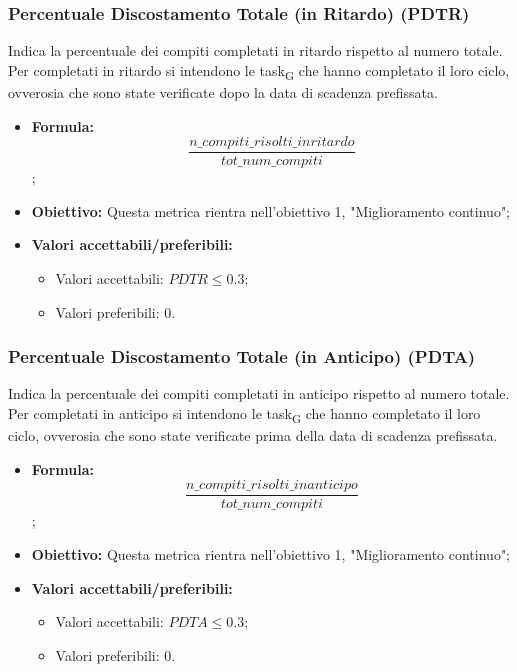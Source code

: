 \subsubsection{Percentuale Discostamento Totale (in Ritardo) (PDTR)}
Indica la percentuale dei compiti completati in ritardo rispetto al numero totale. Per completati in ritardo si intendono le task\textsubscript{G} che hanno completato il loro ciclo, ovverosia che sono state verificate dopo la data di scadenza prefissata.
\begin{itemize}
	\item \textbf{Formula:}\[\frac{n\_compiti\_risolti\_inritardo}{tot\_num\_compiti}\];
	\item \textbf{Obiettivo:} Questa metrica rientra nell'obiettivo 1, "Miglioramento continuo";
	\item \textbf{Valori accettabili/preferibili: }
	\begin{itemize}
		\item Valori accettabili: $PDTR \leq 0.3$;
		\item Valori preferibili: $0$.
	\end{itemize}
\end{itemize}

\subsubsection{Percentuale Discostamento Totale (in Anticipo) (PDTA)}
Indica la percentuale dei compiti completati in anticipo rispetto al numero totale. Per completati in anticipo si intendono le task\textsubscript{G} che hanno completato il loro ciclo, ovverosia che sono state verificate prima della data di scadenza prefissata.
\begin{itemize}
	\item \textbf{Formula:}\[\frac{n\_compiti\_risolti\_inanticipo}{tot\_num\_compiti}\];
	\item \textbf{Obiettivo:} Questa metrica rientra nell'obiettivo 1, "Miglioramento continuo";
	\item \textbf{Valori accettabili/preferibili: }
	\begin{itemize}
		\item Valori accettabili: $PDTA \leq 0.3$;
		\item Valori preferibili: $0$.
	\end{itemize}
\end{itemize}

